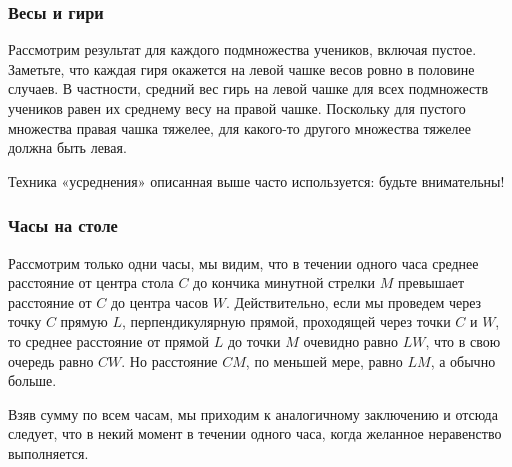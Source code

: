 	







\subsubsection*{Весы и гири}    %

Рассмотрим результат для каждого подмножества учеников, включая пустое.
Заметьте, что каждая гиря окажется на левой чашке весов ровно в половине случаев.
В частности, средний вес гирь на левой чашке для всех подмножеств учеников равен их среднему весу на правой чашке. 
Поскольку для пустого множества правая чашка тяжелее, 
для какого-то другого множества тяжелее должна быть левая.\heart



Техника «усреднения» описанная выше часто используется: будьте внимательны!


\subsubsection*{Часы на столе} %


Рассмотрим только одни часы, 
мы видим, что в течении одного часа среднее расстояние от центра стола $C$ до кончика минутной стрелки $M$ превышает  расстояние от $C$ до центра часов $W$.  
Действительно, если мы проведем через точку $C$ прямую $L$, перпендикулярную прямой, проходящей через точки $C$ и $W$, 
то среднее расстояние от прямой  $L$  до точки $M$ очевидно равно $LW$, 
что в свою очередь равно $CW$.  
Но расстояние $CM$, по меньшей мере, равно $LM$, а обычно больше.

Взяв сумму по всем часам, мы приходим  к аналогичному заключению и отсюда следует, что в некий момент в течении одного часа, когда желанное неравенство выполняется.\heart


